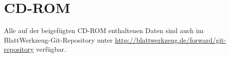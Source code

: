 \chapter{CD-ROM}
\label{sec:cd-rom}

Alle auf der beigefügten CD-ROM enthaltenen Daten sind auch im BlattWerkzeug-Git-Repository unter \url{http://blattwerkzeug.de/forward/git-repository} verfügbar.
